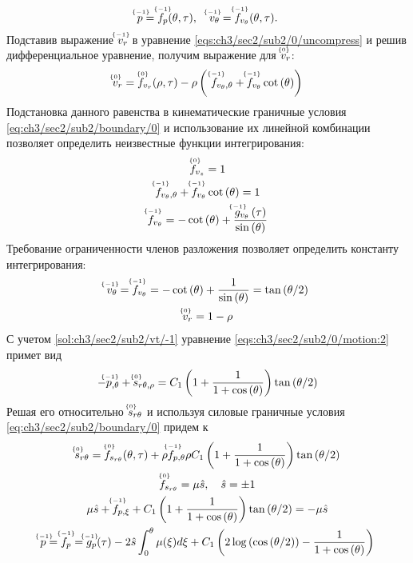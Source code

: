 \begin{equation*}
  \uindex{p}{-1} = \uindex{f}{-1}_{p}(\theta, \tau), \quad \uindex{v}{-1}_{\theta} = \uindex{f}{-1}_{v_{\theta}}(\theta, \tau).
\end{equation*}
Подставив выражение $\uindex{v}{-1}_{r}$ в уравнение \cref{eqs:ch3/sec2/sub2/0/uncompress} и решив дифференциальное уравнение, получим выражение для $\uindex{v}{0}_{r}$:
\begin{equation*}
  \uindex{v}{0}_{r} = \uindex{f}{0}_{v_{r}}(\rho, \tau) -\rho \left(\ \uindex{f}{-1}_{v_{\theta},\theta} + \uindex{f}{-1}_{v_{\theta}} \cot{\left(\theta\right)}\right)
\end{equation*}
Подстановка данного равенства в кинематические граничные условия \cref{eq:ch3/sec2/sub2/boundary/0} и использование их линейной комбинации позволяет определить неизвестные функции интегрирования:
\begin{gather*}
  \uindex{f}{0}_{v_{z}} = 1
  \\
  \uindex{f}{-1}_{v_{\theta},\theta} + \uindex{f}{-1}_{v_{\theta}} \cot{\left(\theta\right)} = 1
  \\
  \uindex{f}{-1}_{v_{\theta}} = -\cot{\left(\theta\right)} + \frac{\uindex{g}{-1}_{v_{\theta}}\left(\tau\right)}{\sin{\left(\theta\right)}}
\end{gather*}
Требование ограниченности членов разложения позволяет определить константу интегрирования:
\begin{gather}
  \label{sol:ch3/sec2/sub2/vt/-1}
  \uindex{v}{-1}_{\theta} = \uindex{f}{-1}_{v_{\theta}} = -\cot{\left(\theta\right)} + \frac{1}{\sin{\left(\theta\right)}} = \tan{\left({\theta / 2}\right)}
  \\
  \label{sol:ch3/sec2/sub2/vr/0}
  \uindex{v}{0}_{r} =  1-\rho
\end{gather}
С учетом \cref{sol:ch3/sec2/sub2/vt/-1} уравнение \cref{eqs:ch3/sec2/sub2/0/motion:2} примет вид
\begin{equation*}
  -\uindex{p}{-1}_{,\theta} + \uindex{s}{0}_{r\theta,\rho} = C_1 \left(1+\frac{1}{1+\cos{\left(\theta\right)}}\right) \tan{\left({\theta / 2}\right)}
\end{equation*}
Решая его относительно $\uindex{s}{0}_{r\theta}$ и используя силовые граничные условия \cref{eq:ch3/sec2/sub2/boundary/0} придем к
\begin{gather*}
  \uindex{s}{0}_{r\theta} = \uindex{f}{0}_{s_{r\theta}}(\theta, \tau) + \rho  \uindex{f}{-1}_{p,\theta} \rho C_1 \left(1+\frac{1}{1+\cos{\left(\theta\right)}}\right) \tan{\left({\theta / 2}\right)}
  \\
  \uindex{f}{0}_{s_{r\theta}} = \mu\hat{s}, \quad \hat{s} = \pm 1
  \\
  \mu\hat{s} + \uindex{f}{-1}_{p,\xi} + C_1 \left(1+\frac{1}{1+\cos{\left(\theta\right)}}\right) \tan{\left({\theta / 2}\right)}= -\mu \hat{s}
  \\
  \uindex{p}{-1}=\uindex{f}{-1}_{p} =\uindex{g}{-1}_{p}(\tau) -2\hat{s}\int_0^{\theta}{\mu(\xi)d\xi} + C_1 \left(2\log{\left(\cos{\left({\theta / 2}\right)}\right)} - \frac{1}{1+\cos{\left(\theta\right)}}\right)
\end{gather*}
